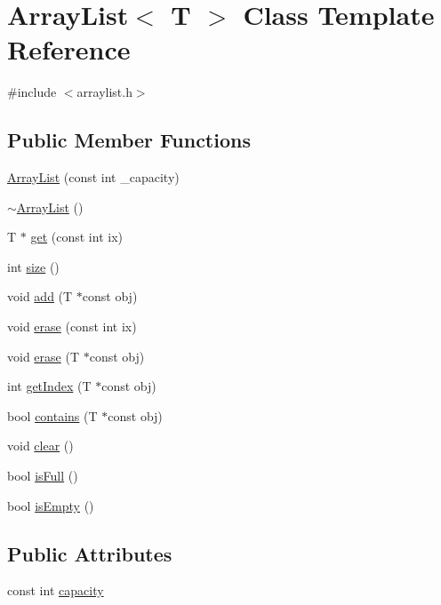 \hypertarget{classArrayList}{}\section{Array\+List$<$ T $>$ Class Template Reference}
\label{classArrayList}


{\ttfamily \#include $<$arraylist.\+h$>$}

\subsection*{Public Member Functions}
\begin{DoxyCompactItemize}
\item 
\hyperlink{classArrayList_a326c25843211d91c735f53a6ad4a704e}{Array\+List} (const int \+\_\+capacity)
\item 
\hyperlink{classArrayList_a4af637822f64b61267b1e0ed4d4fca33}{$\sim$\+Array\+List} ()
\item 
T $\ast$ \hyperlink{classArrayList_a5a6bcfd414e7a7cfd4760a21e1eaf8c0}{get} (const int ix)
\item 
int \hyperlink{classArrayList_ae5c94c16a0186b9955ff584cf445dee8}{size} ()
\item 
void \hyperlink{classArrayList_a7f73aec2db182b891665e95917e69000}{add} (T $\ast$const obj)
\item 
void \hyperlink{classArrayList_ada0edc3b311f26d8b9611ffc6a0504c5}{erase} (const int ix)
\item 
void \hyperlink{classArrayList_a3bde0dcf3bfc85468bdb85f8773e6630}{erase} (T $\ast$const obj)
\item 
int \hyperlink{classArrayList_a0059f89292056026e8a4b900828d364e}{get\+Index} (T $\ast$const obj)
\item 
bool \hyperlink{classArrayList_a934e6fc0664f4227194212c1dc73cbcb}{contains} (T $\ast$const obj)
\item 
void \hyperlink{classArrayList_acb53d54675318c94332d0ec8b6819eb3}{clear} ()
\item 
bool \hyperlink{classArrayList_abca4b69f0844b065f47c15843578d3b7}{is\+Full} ()
\item 
bool \hyperlink{classArrayList_afd03a1f3e7d06aeef6f49b65406464b8}{is\+Empty} ()
\end{DoxyCompactItemize}
\subsection*{Public Attributes}
\begin{DoxyCompactItemize}
\item 
const int \hyperlink{classArrayList_a67885e14511b74dda49074ffa39d4761}{capacity}
\end{DoxyCompactItemize}


